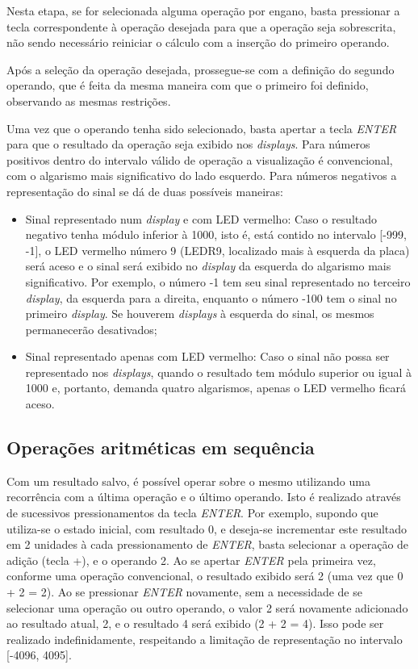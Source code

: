 \documentclass[a4paper,11pt]{article}
\begin{document}
Nesta etapa, se for selecionada alguma operação por engano, basta pressionar a tecla correspondente à operação desejada para que a operação seja sobrescrita, não sendo necessário reiniciar o cálculo com a inserção do primeiro operando.

Após a seleção da operação desejada, prossegue-se com a definição do segundo operando, que é feita da mesma maneira com que o primeiro foi definido, observando as mesmas restrições. 

Uma vez que o operando tenha sido selecionado, basta apertar a tecla \textit{ENTER} para que o resultado da operação seja exibido nos \textit{displays}. Para números positivos dentro do intervalo válido de operação a visualização é convencional, com o algarismo mais significativo do lado esquerdo. Para números negativos a representação do sinal se dá de duas possíveis maneiras:

\begin{itemize}
	\item Sinal representado num \textit{display} e com LED vermelho: Caso o resultado negativo tenha módulo inferior à 1000, isto é, está contido no intervalo [-999, -1], o LED vermelho número 9 (LEDR9, localizado mais à esquerda da placa) será aceso e o sinal será exibido no \textit{display} da esquerda do algarismo mais significativo. Por exemplo, o número -1 tem seu sinal representado no terceiro \textit{display}, da esquerda para a direita, enquanto o número -100 tem o sinal no primeiro \textit{display}. Se houverem \textit{displays} à esquerda do sinal, os mesmos permanecerão desativados;
	
	\item Sinal representado apenas com LED vermelho: Caso o sinal não possa ser representado nos \textit{displays}, quando o resultado tem módulo superior ou igual à 1000 e, portanto, demanda quatro algarismos, apenas o LED vermelho ficará aceso.
\end{itemize}

\subsection{Operações aritméticas em sequência}

Com um resultado salvo, é possível operar sobre o mesmo utilizando uma recorrência com a última operação e o último operando. Isto é realizado através de sucessivos pressionamentos da tecla \textit{ENTER}. Por exemplo, supondo que utiliza-se o estado inicial, com resultado 0, e deseja-se incrementar este resultado em 2 unidades à cada pressionamento de \textit{ENTER}, basta selecionar a operação de adição (tecla +), e o operando 2. Ao se apertar \textit{ENTER} pela primeira vez, conforme uma operação convencional, o resultado exibido será 2 (uma vez que 0 + 2 = 2). Ao se pressionar \textit{ENTER} novamente, sem a necessidade de se selecionar uma operação ou outro operando, o valor 2 será novamente adicionado ao resultado atual, 2, e o resultado 4 será exibido (2 + 2 = 4). Isso pode ser realizado indefinidamente, respeitando a limitação de representação no intervalo [-4096, 4095].
\end{document}
